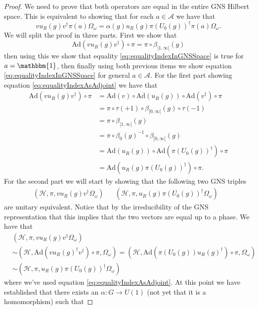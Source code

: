 \documentclass[12pt,a4paper,twoside]{article}
\newcommand{\HH}{\mathcal H}
\renewcommand{\AA}{\mathcal A}
\newcommand{\one}{\mathbbm{1}}
\newcommand{\Ad}{\textrm{Ad}}
\theoremstyle{definition}
\numberwithin{equation}{section}
\begin{document}
\begin{proof}
	We need to prove that both operators are equal in the entire GNS Hilbert space. This is equivalent to showing that for each $a\in\AA$ we have that
	\begin{equation}\label{eq:equalityIndexInGNSSpace}
		v u_R(g)v^\dagger \pi(a)\Omega_\omega =\alpha(g) u_R(g)\pi(U_0(g))^\dagger\pi(a)\Omega_\omega.
	\end{equation}
	We will split the proof in three parts. First we show that
	\begin{equation}\label{eq:equalityIndexAsAdjoint}
		\Ad(v u_R(g)v^\dagger)\circ\pi=\pi\circ\beta_{[1,\infty[}(g)
	\end{equation}
	then using this we show that equality \eqref{eq:equalityIndexInGNSSpace} is true for $a=\one$, then finally using both previous items we show equation \eqref{eq:equalityIndexInGNSSpace} for general $a\in\AA$. For the first part showing equation \eqref{eq:equalityIndexAsAdjoint} we have that
	\begin{align}
		\Ad(v u_R(g)v^\dagger)\circ\pi&=\Ad(v)\circ\Ad(u_R(g))\circ\Ad(v^\dagger)\circ\pi\\
		&=\pi\circ\tau(+1)\circ\beta_{[0,\infty[}(g)\circ\tau(-1)\\
		&=\pi\circ\beta_{[1,\infty[}(g)\\
		&=\pi\circ\beta_0(g)^{-1}\circ\beta_{[0,\infty[}(g)\\
		&=\Ad(u_R(g))\circ\Ad(\pi(U_0(g))^\dagger)\circ\pi\\
		&=\Ad(u_R(g)\pi(U_0(g))^\dagger)\circ\pi.
	\end{align}
	For the second part we will start by showing that the following two GNS triples
	\begin{align}\label{eq:TwoGNSTriples}
		(\HH,\pi,v u_R(g)v^\dagger \Omega_\omega)&&(\HH,\pi,u_R(g)\pi(U_0(g))^\dagger \Omega_\omega)&
	\end{align}
	are unitary equivalent. Notice that by the irreducibility of the GNS representation that this implies that the two vectors are equal up to a phase. We have that
	 \begin{align}
	 	&(\HH,\pi,v u_R(g)v^\dagger \Omega_\omega)\\
	 	&\sim (\HH,\Ad(v u_R(g)^\dagger v^\dagger)\circ\pi,\Omega_\omega)=(\HH,\Ad(\pi(U_0(g))u_R(g)^\dagger)\circ\pi,\Omega_\omega)\\
	 	&\sim (\HH,\pi,u_R(g)\pi(U_0(g))^\dagger \Omega_\omega)
	 \end{align}
 	where we've used equation \eqref{eq:equalityIndexAsAdjoint}. At this point we have established that there exists an $\alpha:G\rightarrow U(1)$ (not yet that it is a homomorphism) such that

\end{proof}
\end{document}
